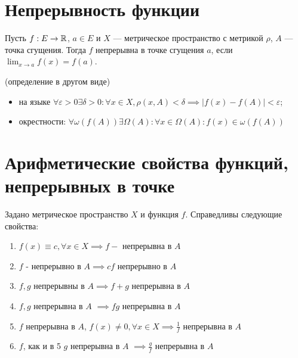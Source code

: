 



\section{Непрерывность функции}

\begin{definition}
    Пусть $f: E \to \mathbb{R}$, $a \in E$ и $X$ --- метрическое пространство с метрикой $\rho$, $A$ --- точка сгущения. Тогда $f$ непрерывна в точке сгущения $a$, если $\lim_{x \to a} f(x) = f(a)$.
\end{definition}

\begin{definition} (определение в другом виде)
    
    \begin{itemize}
        \item на языке $\forall \varepsilon > 0 \exists \delta > 0: \forall x \in X, \rho(x, A) < \delta \implies |f(x) - f(A)| < \varepsilon$;
        \item окрестности: $\forall \omega(f(A)) \exists \Omega(A): \forall x \in \Omega(A): f(x) \in \omega (f(A))$
    \end{itemize}
\end{definition}

\section{Арифметические свойства функций, непрерывных в точке}

\begin{properties}
    
    Задано метрическое пространство $X$ и функция $f$. Справедливы следующие свойства:
    
    \begin{enumerate}
        \item $f(x) \equiv c, \forall x \in X \implies f -$ непрерывна в $A$
        \item $f$ -  непрерывно в $A \implies cf$  непрерывно в $A$
        \item $f, g$  непрерывны в $A \implies f + g$ непрерывна в $A$
        \item $f, g$ непрерывна в $A$ $\implies fg$ непрерывна в $A$
        \item $f$ непрерывна в $A$, $f(x) \neq 0, \forall x \in X \implies \displaystyle\frac{1}{f}$ непрерывна в $A$
        \item $f$, как и в 5 $g$ непрерывна в $A$ $\implies \displaystyle\frac{g}{f}$ непрерывна в $A$
    \end{enumerate}
\end{properties}

